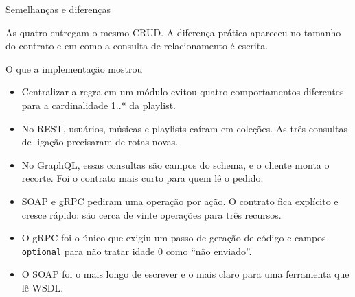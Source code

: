 \documentclass[aspectratio=169,11pt]{beamer}
\begin{document}
\begin{frame}{Semelhanças e diferenças}
  \centering

  \vspace{0.6em}
  \small
  As quatro entregam o mesmo CRUD. A diferença prática apareceu no tamanho do contrato e em como a consulta de relacionamento é escrita.
\end{frame}

\begin{frame}{O que a implementação mostrou}
  \begin{itemize}
    \item Centralizar a regra em um módulo evitou quatro comportamentos diferentes para a cardinalidade 1..* da playlist.
    \item No REST, usuários, músicas e playlists caíram em coleções. As três consultas de ligação precisaram de rotas novas.
    \item No GraphQL, essas consultas são campos do schema, e o cliente monta o recorte. Foi o contrato mais curto para quem lê o pedido.
    \item SOAP e gRPC pediram uma operação por ação. O contrato fica explícito e cresce rápido: são cerca de vinte operações para três recursos.
    \item O gRPC foi o único que exigiu um passo de geração de código e campos \texttt{optional} para não tratar idade 0 como ``não enviado''.
    \item O SOAP foi o mais longo de escrever e o mais claro para uma ferramenta que lê WSDL.
  \end{itemize}
\end{frame}
\end{document}
